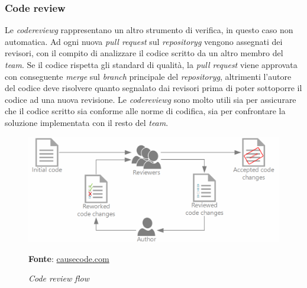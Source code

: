 \subsubsection{Code review}
Le \textit{\gls{codereviewg}} rappresentano un altro strumento di verifica, in questo caso non automatica. Ad ogni nuova \textit{pull request} sul \textit{\gls{repositoryg}} vengono assegnati dei revisori, con il compito di analizzare il codice scritto da un altro membro del \textit{team}. Se il codice rispetta gli standard di qualità, la \textit{pull request} viene approvata con conseguente \textit{merge} sul \textit{branch} principale del \textit{\gls{repositoryg}}, altrimenti l'autore del codice deve risolvere quanto segnalato dai revisori prima di poter sottoporre il codice ad una nuova revisione. Le \textit{\gls{codereviewg}} sono molto utili sia per assicurare che il codice scritto sia conforme alle norme di codifica, sia per confrontare la soluzione implementata con il resto del \textit{team}.

    \begin{figure}[ht]
        \centering
        \includegraphics[width=1\textwidth]{immagini/code_review.png}
        \caption{\textit{Code review flow}}
        \textbf{Fonte}:
        \href{https://storage.googleapis.com/causecode-wordpress-media/2019/01/97795825-code-review-process-1024x429.png}{causecode.com}
        \label{fig: Code review flow}
    \end{figure}

